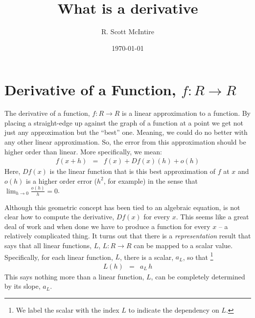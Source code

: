 \documentclass{article}
\title{What is a derivative}
\author{R. Scott McIntire}
\date{\today}
\begin{document}
\maketitle

\section{Derivative of a Function, $f: R\rightarrow R$}
The derivative of a function, $f : R \rightarrow R$ is a linear approximation to
a function. By placing a straight-edge up against the graph of a function at
a point we get not just any approximation but the ``best''{} one. Meaning,
we could do no better with any other linear approximation. So, the error
from this approximation should be higher order than linear. More specifically,
we mean:
\begin{eqnarray}
f(x + h) & = & f(x) + Df(x)(h) + o(h) \label{simderdef}
\end{eqnarray}
Here, $Df(x)$ is the linear function that is this best approximation of $f$ at $x$
and $o(h)$ is a higher order error ($h^2$, for example) in the sense that
$\lim_{h\rightarrow 0} \frac{o(h)}{h} = 0$.

Although this geometric concept has been tied to an algebraic equation,
is not clear how to compute the derivative, $Df(x)$ for every $x$. This seems
like a great deal of work and when done we have to produce a function for
every $x$ -- a relatively complicated thing. It turns out that there is a
{\em representation\/} result	 that says that all linear functions, $L$,
$L: R \rightarrow R$ can be mapped to a scalar value.
Specifically, for each linear function, $L$, there is a scalar, $a_L$, so that%
\footnote{We label the scalar with the index $L$ to indicate the dependency on $L$.}
\begin{eqnarray}
  L(h) & = & a_L \, h
\end{eqnarray}
This says nothing more than a linear function, $L$, can be completely determined
by its slope, $a_L$.
\end{document}
